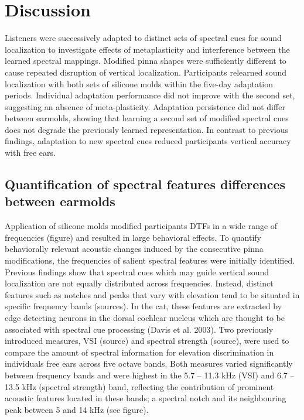 \section{Discussion}\label{sec1}%

Listeners were successively adapted to distinct sets of spectral cues for sound localization to investigate effects of metaplasticity and interference between the learned spectral mappings. Modified pinna shapes were sufficiently different to cause repeated disruption of vertical localization. Participants relearned sound localization with both sets of silicone molds within the five-day adaptation periods. Individual adaptation performance did not improve with the second set, suggesting an absence of meta-plasticity. Adaptation persistence did not differ between earmolds, showing that learning a second set of modified spectral cues does not degrade the previously learned representation. In contrast to previous findings, adaptation to new spectral cues reduced participants vertical accuracy with free ears.

\subsection{Quantification of spectral features differences between earmolds}

Application of silicone molds modified participants DTFs in a wide range of frequencies (figure) and resulted in large behavioral effects. To quantify behaviorally relevant acoustic changes induced by the consecutive pinna modifications, the frequencies of salient spectral features were initially identified. Previous findings show that spectral cues which may guide vertical sound localization are not equally distributed across frequencies. Instead, distinct features such as notches and peaks that vary with elevation tend to be situated in specific frequency bands (sources). In the cat, these features are extracted by edge detecting neurons in the dorsal cochlear nucleus which are thought to be associated with spectral cue processing (Davis et al. 2003). Two previously introduced measures, VSI (source) and spectral strength (source), were used to compare the amount of spectral information for elevation discrimination in individuals free ears across five octave bands. Both measures varied significantly between frequency bands and were highest in the 5.7 – 11.3 kHz (VSI) and 6.7 – 13.5 kHz (spectral strength) band, reflecting the contribution of prominent acoustic features located in these bands; a spectral notch and its neighbouring peak between 5 and 14 kHz (see figure). 

